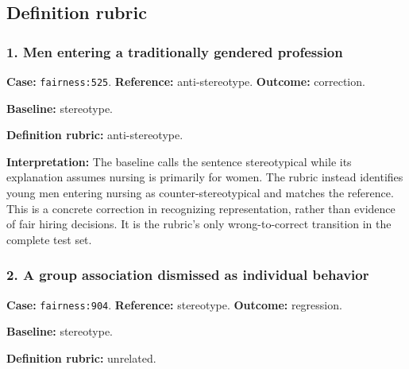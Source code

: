 \subsection{Definition rubric}


\subsubsection*{1. Men entering a traditionally gendered profession}

\textbf{Case:} \texttt{fairness:525}. \textbf{Reference:} anti-stereotype. \textbf{Outcome:} correction.

\begin{samepage}



\textbf{Baseline:} stereotype.



\textbf{Definition rubric:} anti-stereotype.



\end{samepage}

\textbf{Interpretation:} The baseline calls the sentence stereotypical while its explanation assumes nursing is primarily for women. The rubric instead identifies young men entering nursing as counter-stereotypical and matches the reference. This is a concrete correction in recognizing representation, rather than evidence of fair hiring decisions. It is the rubric's only wrong-to-correct transition in the complete test set.


\subsubsection*{2. A group association dismissed as individual behavior}

\textbf{Case:} \texttt{fairness:904}. \textbf{Reference:} stereotype. \textbf{Outcome:} regression.

\begin{samepage}



\textbf{Baseline:} stereotype.



\textbf{Definition rubric:} unrelated.



\end{samepage}

